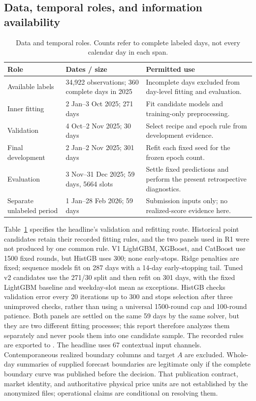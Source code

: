 \documentclass[11pt,a4paper]{article}
\begin{document}
\subsection{Data, temporal roles, and information availability}
\begin{table}[!htbp]\centering\small
\caption{Data and temporal roles. Counts refer to complete labeled days, not every calendar day in each span.}\label{tab:data}
\begin{tabularx}{\linewidth}{@{}p{.19\linewidth}p{.28\linewidth}X@{}}\toprule
Role & Dates / size & Permitted use \\\midrule
Available labels & 34,922 observations; 360 complete days in 2025 & Incomplete days excluded from day-level fitting and evaluation. \\
Inner fitting & 2 Jan--3 Oct 2025; 271 days & Fit candidate models and training-only preprocessing. \\
Validation & 4 Oct--2 Nov 2025; 30 days & Select recipe and epoch rule from development evidence. \\
Final development & 2 Jan--2 Nov 2025; 301 days & Refit each fixed seed for the frozen epoch count. \\
Evaluation & 3 Nov--31 Dec 2025; 59 days, 5664 slots & Settle fixed predictions and perform the present retrospective diagnostics. \\
Separate unlabeled period & 1 Jan--28 Feb 2026; 59 days & Submission inputs only; no realized-score evidence here. \\\bottomrule
\end{tabularx}\end{table}

Table~\ref{tab:data} specifies the headline's validation and refitting route. Historical point candidates retain their recorded fitting rules, and the two panels used in R1 were not produced by one common rule. V1 LightGBM, XGBoost, and CatBoost use 1500 fixed rounds, but HistGB uses 300; none early-stops. Ridge penalties are fixed; sequence models fit on 287 days with a 14-day early-stopping tail. Tuned v2 candidates use the 271/30 split and then refit on 301 days, with the fixed LightGBM baseline and weekday-slot mean as exceptions. HistGB checks validation error every 20 iterations up to 300 and stops selection after three unimproved checks, rather than using a universal 1500-round cap and 100-round patience. Both panels are settled on the same 59 days by the same solver, but they are two different fitting processes; this report therefore analyzes them separately and never pools them into one candidate sample. The recorded rules are exported to . The headline uses 67 contextual input channels. Contemporaneous realized boundary columns and target $A$ are excluded. Whole-day summaries of supplied forecast boundaries are legitimate only if the complete boundary curve was published before the decision. That publication contract, market identity, and authoritative physical price units are not established by the anonymized files; operational claims are conditional on resolving them.
\end{document}
